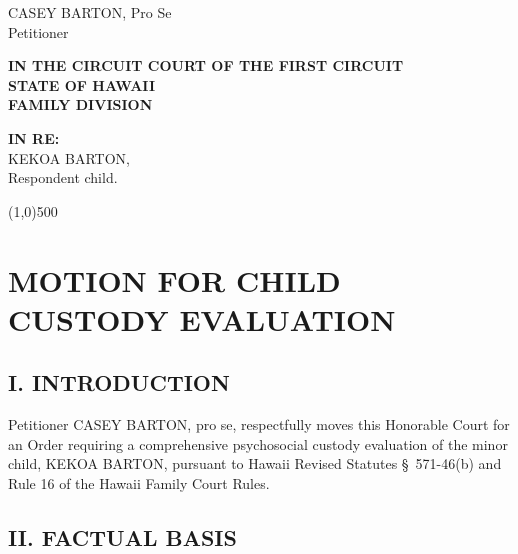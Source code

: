 \documentclass[11pt,letter]{article}
\begin{document}
\noindent
\begin{flushright}
CASEY BARTON, Pro Se \\  
Petitioner \\[0.3cm]
\end{flushright}

\begin{center}
\textbf{IN THE CIRCUIT COURT OF THE FIRST CIRCUIT} \\
\textbf{STATE OF HAWAII} \\
\textbf{FAMILY DIVISION}
\end{center}

\begin{flushleft}
\textbf{IN RE:} \\[0.2cm]
KEKOA BARTON, \\[0.2cm]
\hspace{1cm} Respondent child. 
\end{flushleft}

\vspace{0.5cm}
\line(1,0){500}
\vspace{0.5cm}

\section*{MOTION FOR CHILD CUSTODY EVALUATION}

\subsection*{I. INTRODUCTION}

Petitioner CASEY BARTON, pro se, respectfully moves this Honorable Court for an Order requiring a comprehensive psychosocial custody evaluation of the minor child, KEKOA BARTON, pursuant to Hawaii Revised Statutes \S~571-46(b) and Rule 16 of the Hawaii Family Court Rules.

\subsection*{II. FACTUAL BASIS}
\end{document}
